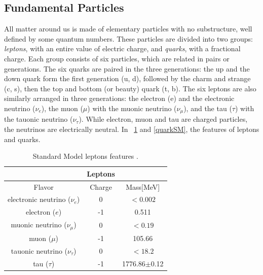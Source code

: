 \subsection{Fundamental Particles}
\label{cap1:pi}
All matter around us is made of elementary particles with no substructure, well defined by some quantum numbers. These particles are divided into two groups: \textit{leptons}, with an entire value of electric charge, and \textit{quarks}, with a fractional charge. Each group consists of six particles, which are related in pairs or generations. The six quarks are paired in the three generations: the up and the down quark form the first generation (u, d), followed by the charm and strange  (c, s), then the top and bottom (or beauty) quark (t, b).  The six leptons are also similarly arranged in three generations: the electron (e) and the electronic neutrino ($\nu_{e}$), the muon ($\mu$)  with the muonic neutrino ($\nu_{\mu}$), and the tau ($\tau$) with the tauonic neutrino ($\nu_{\tau}$). While electron, muon and tau are charged particles, the neutrinos are electrically neutral. In \tablename~\ref{leptonsSM} and \ref{quarkSM}, the features of leptons and quarks.
\begin{table}[ht]	
	\begin{center}
		\begin{tabular}{|ccc|}
			\hline     & \textbf{Leptons} &   \\
			\hline   Flavor & Charge & Mass[MeV]  \\
			\hline
			\hline
			electronic neutrino ($\nu_{e}$) & 0 & $<0.002$   \\
			electron ($e$) & -1 & 0.511   \\
			\hline
			muonic neutrino ($\nu_{\mu}$) & 0 & $<0.19$   \\
			muon ($\mu$) & -1 & 105.66   \\
			\hline
			tauonic neutrino ($\nu_{\tau}$) & 0 & $<18.2$ \\
			tau ($\tau$) & -1 & 1776.86$\pm$0.12  \\
			\hline
			\hline
		\end{tabular}
	\end{center}
	\caption{Standard Model leptons features \cite{PDG}.}
	\label{leptonsSM}
\end{table}


